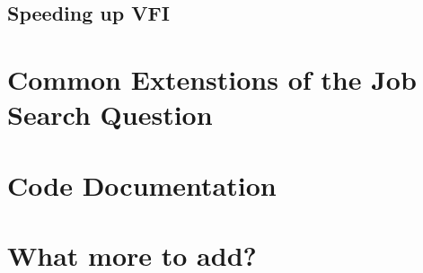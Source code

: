 \documentclass[11pt,english]{article}
\begin{document}
\subsection{Speeding up VFI}

\section{Common Extenstions of the Job Search Question}



\section{Code Documentation}

\section{What more to add?}
\end{document}
